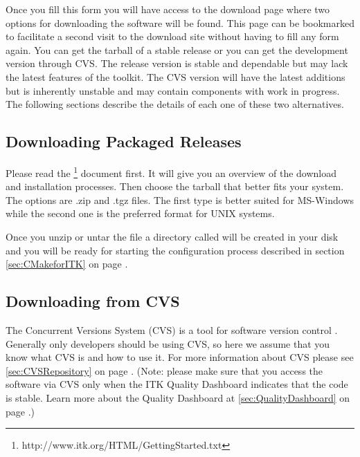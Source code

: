 Once you fill this form you will have access to the download page where two
options for downloading the software will be found. This page can be bookmarked
to facilitate a second visit to the download site without having to fill any
form again. You can get the tarball of a stable release or you can get the
development version through CVS.  The release version is stable and dependable
but may lack the latest features of the toolkit. The CVS version will have the
latest additions but is inherently unstable and may contain components with
work in progress.  The following sections describe the details of each one of
these two alternatives.

\subsection{Downloading Packaged Releases}
\label{sec:DownloadingReleases}


Please read the 
\footnote{http://www.itk.org/HTML/GettingStarted.txt} document 
first. It will give you an overview of the download and installation
processes. Then choose the tarball that better fits your system. The options
are .zip and .tgz files.  The first type is better suited for MS-Windows
while the second one is the preferred format for UNIX systems.

Once you unzip or untar the file a directory called  will be
created in your disk and you will be ready for starting the configuration
process described in section \ref{sec:CMakeforITK} on page 
\pageref{sec:CMakeforITK}.

\subsection{Downloading from CVS}
\label{sec:DownloadingFromCVS}


The Concurrent Versions System (CVS) is a tool for software version control
\cite{Fogel1999}. Generally only developers should be using CVS, so here we 
assume that you know what CVS is and how to use it.  For more information
about CVS please see \ref{sec:CVSRepository} on page 
\pageref{sec:CVSRepository}. (Note: please make sure that you access the 
software via CVS only when the ITK Quality Dashboard indicates that the 
code is stable. Learn more about the Quality Dashboard at
\ref{sec:QualityDashboard} on page \pageref{sec:QualityDashboard}.)

